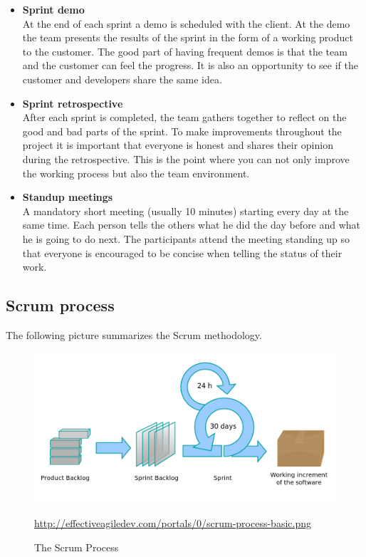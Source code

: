 \begin{itemize}
\item{\textbf{Sprint demo}}\\
At the end of each sprint a demo is scheduled with the client. At the demo the team presents the results of the sprint 
in the form of a working product to the customer. The good part of having frequent demos is that the team and the customer can
feel the progress. It is also an opportunity to see if the customer and developers share the same idea.

\item{\textbf{Sprint retrospective}}\\
After each sprint is completed, the team gathers together to reflect on the good and bad parts of the sprint.
To make improvements throughout the project it is important that everyone is honest and shares their opinion during the retrospective.
This is the point where you can not only improve the working process but also the team environment.

\item{\textbf{Standup meetings}}\\
A mandatory short meeting (usually 10 minutes) starting every day at the same time.
Each person tells the others what he did the day before and what he is going to do
next. The participants attend the meeting standing up so that everyone is encouraged to be concise
when telling the status of their work.

\end{itemize}
\pagebreak

\subsection{Scrum process}
The following picture summarizes the Scrum methodology.

\begin{figure}[!h]
\centering
\includegraphics[scale=0.35]{graphics/scrum.png}
\caption{The Scrum Process}\label{fig:scrum_process}
\url{http://effectiveagiledev.com/portals/0/scrum-process-basic.png}
\end{figure}
